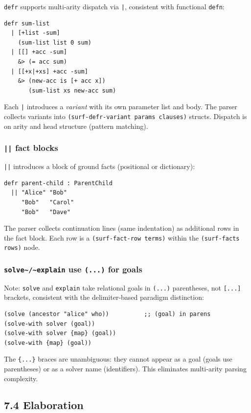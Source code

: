 \documentclass[11pt]{article}
\begin{document}
\texttt{defr} supports multi-arity dispatch via \texttt{|}, consistent with functional \texttt{defn}:

\begin{verbatim}
defr sum-list
  | [+list -sum]
    (sum-list list 0 sum)
  | [[] +acc -sum]
    &> (= acc sum)
  | [[+x|+xs] +acc -sum]
    &> (new-acc is [+ acc x])
       (sum-list xs new-acc sum)
\end{verbatim}

Each \texttt{|} introduces a \emph{variant} with its own parameter list and body. The
parser collects variants into \texttt{(surf-defr-variant params clauses)} structs.
Dispatch is on arity and head structure (pattern matching).
\subsubsection{\texttt{||} fact blocks}
\label{sec:orgfbaf70e}

\texttt{||} introduces a block of ground facts (positional or dictionary):

\begin{verbatim}
defr parent-child : ParentChild
  || "Alice" "Bob"
     "Bob"   "Carol"
     "Bob"   "Dave"
\end{verbatim}

The parser collects continuation lines (same indentation) as additional rows
in the fact block. Each row is a \texttt{(surf-fact-row terms)} within the
\texttt{(surf-facts rows)} node.
\subsubsection{\texttt{solve\textasciitilde{}/\textasciitilde{}explain} use \texttt{(...)} for goals}
\label{sec:orgad77aa0}

Note: \texttt{solve} and \texttt{explain} take relational goals in \texttt{(...)} parentheses,
not \texttt{[...]} brackets, consistent with the delimiter-based paradigm distinction:

\begin{verbatim}
(solve (ancestor "alice" who))          ;; (goal) in parens
(solve-with solver (goal))
(solve-with solver {map} (goal))
(solve-with {map} (goal))
\end{verbatim}

The \texttt{\{...\}} braces are unambiguous: they cannot appear as a goal (goals use
parentheses) or as a solver name (identifiers). This eliminates multi-arity
parsing complexity.
\subsection{7.4 Elaboration}
\label{sec:org8cb2e73}
\end{document}
